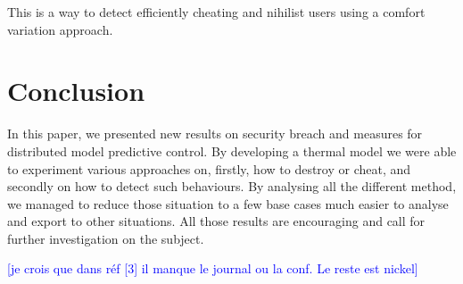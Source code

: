 \documentclass[conference]{IEEEtran}
\newcommand{\rem}[1]{\textcolor{blue}{[#1]}}
\begin{document}
This is a way to detect efficiently cheating and nihilist users using a comfort variation approach.  


\section{Conclusion}
In this paper, we presented new results on security breach and measures for distributed model predictive control. By developing a thermal model we were able to experiment various approaches on,  firstly,  how to destroy or cheat, and secondly on how to detect such behaviours. By analysing all  the different method, we managed to reduce those situation to a few base cases much easier to analyse and export to other situations. All those results are encouraging and call for further investigation on the subject. 



\rem{je crois que dans réf [3] il manque le journal ou la conf. Le reste est nickel}
\end{document}
